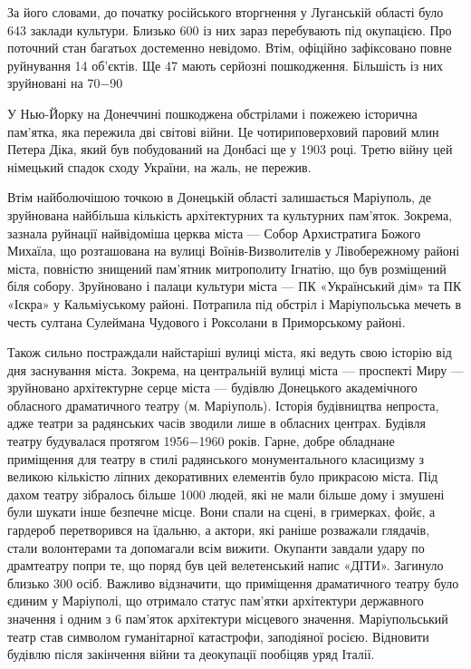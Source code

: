 За його словами, до початку російського вторгнення у Луганській області було
643 заклади культури. Близько 600 із них зараз перебувають під окупацією. Про
поточний стан багатьох достеменно невідомо. Втім, офіційно зафіксовано повне
руйнування 14 об'єктів. Ще 47 мають серйозні пошкодження. Більшість із них
зруйновані на 70−90%

У Нью-Йорку на Донеччині пошкоджена обстрілами і пожежею історична пам'ятка,
яка пережила дві світові війни. Це чотириповерховий паровий млин Петера Діка,
який був побудований на Донбасі ще у 1903 році. Третю війну цей німецький
спадок сходу України, на жаль, не пережив.

Втім найболючішою точкою в Донецькій області залишається Маріуполь, де
зруйнована найбільша кількість архітектурних та культурних пам'яток. Зокрема,
зазнала руйнації найвідоміша церква міста — Собор Архистратига Божого Михаїла,
що розташована на вулиці Воїнів-Визволителів у Лівобережному районі міста,
повністю знищений пам'ятник митрополиту Ігнатію, що був розміщений біля собору.
Зруйновано і палаци культури міста — ПК «Український дім» та ПК «Іскра» у
Кальміуському районі. Потрапила під обстріл і Маріупольська мечеть в честь
султана Сулеймана Чудового і Роксолани в Приморському районі.

Також сильно постраждали найстаріші вулиці міста, які ведуть свою історію від
дня заснування міста. Зокрема, на центральній вулиці міста — проспекті Миру —
зруйновано архітектурне серце міста — будівлю Донецького академічного обласного
драматичного театру (м. Маріуполь). Історія будівництва непроста, адже театри
за радянських часів зводили лише в обласних центрах. Будівля театру будувалася
протягом 1956−1960 років. Гарне, добре обладнане приміщення для театру в стилі
радянського монументального класицизму з великою кількістю ліпних декоративних
елементів було прикрасою міста. Під дахом театру зібралось більше 1000 людей,
які не мали більше дому і змушені були шукати інше безпечне місце. Вони спали
на сцені, в гримерках, фойє, а гардероб перетворився на їдальню, а актори, які
раніше розважали глядачів, стали волонтерами та допомагали всім вижити.
Окупанти завдали удару по драмтеатру попри те, що поряд був цей велетенський
напис «ДІТИ». Загинуло близько 300 осіб. Важливо відзначити, що приміщення
драматичного театру було єдиним у Маріуполі, що отримало статус пам'ятки
архітектури державного значення і одним з 6 пам'яток архітектури місцевого
значення. Маріупольський театр став символом гуманітарної катастрофи,
заподіяної росією. Відновити будівлю після закінчення війни та деокупації
пообіцяв уряд Італії.

